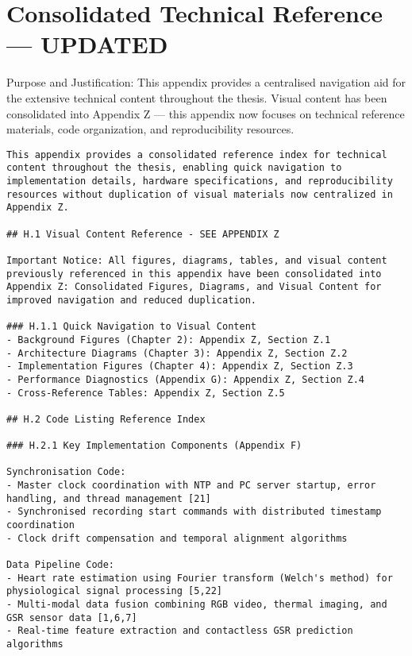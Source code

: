\chapter{Consolidated Technical Reference — UPDATED}

Purpose and Justification: This appendix provides a centralised navigation aid for the extensive technical content throughout the thesis. Visual content has been consolidated into Appendix Z — this appendix now focuses on technical reference materials, code organization, and reproducibility resources.


\begin{verbatim}
This appendix provides a consolidated reference index for technical content throughout the thesis, enabling quick navigation to implementation details, hardware specifications, and reproducibility resources without duplication of visual materials now centralized in Appendix Z.

## H.1 Visual Content Reference - SEE APPENDIX Z

Important Notice: All figures, diagrams, tables, and visual content previously referenced in this appendix have been consolidated into Appendix Z: Consolidated Figures, Diagrams, and Visual Content for improved navigation and reduced duplication.

### H.1.1 Quick Navigation to Visual Content
- Background Figures (Chapter 2): Appendix Z, Section Z.1
- Architecture Diagrams (Chapter 3): Appendix Z, Section Z.2
- Implementation Figures (Chapter 4): Appendix Z, Section Z.3
- Performance Diagnostics (Appendix G): Appendix Z, Section Z.4
- Cross-Reference Tables: Appendix Z, Section Z.5

## H.2 Code Listing Reference Index

### H.2.1 Key Implementation Components (Appendix F)

Synchronisation Code:
- Master clock coordination with NTP and PC server startup, error handling, and thread management [21]
- Synchronised recording start commands with distributed timestamp coordination
- Clock drift compensation and temporal alignment algorithms

Data Pipeline Code:
- Heart rate estimation using Fourier transform (Welch's method) for physiological signal processing [5,22]
- Multi-modal data fusion combining RGB video, thermal imaging, and GSR sensor data [1,6,7]
- Real-time feature extraction and contactless GSR prediction algorithms


\end{verbatim}
